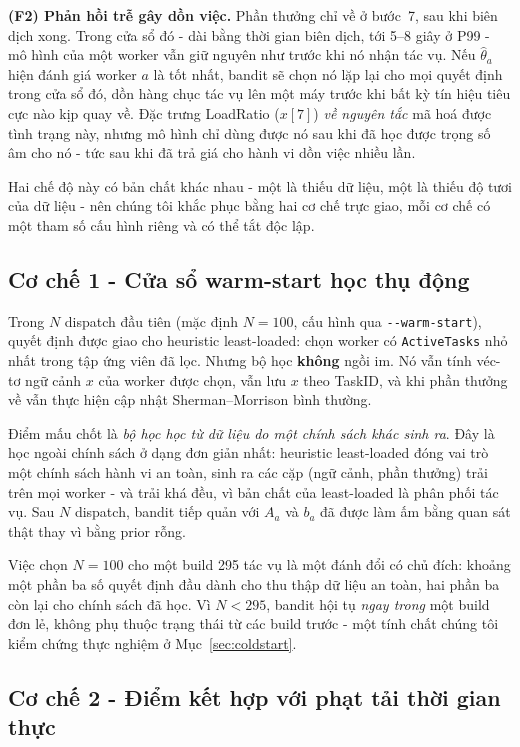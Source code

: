 \documentclass[final,5p,times,twocolumn]{elsarticle}
\begin{document}
\textbf{(F2) Phản hồi trễ gây dồn việc.} Phần thưởng chỉ về ở bước~7, sau khi biên dịch xong. Trong cửa sổ đó - dài bằng thời gian biên dịch, tới 5--8 giây ở P99 - mô hình của một worker vẫn giữ nguyên như trước khi nó nhận tác vụ. Nếu $\hat\theta_a$ hiện đánh giá worker $a$ là tốt nhất, bandit sẽ chọn nó lặp lại cho mọi quyết định trong cửa sổ đó, dồn hàng chục tác vụ lên một máy trước khi bất kỳ tín hiệu tiêu cực nào kịp quay về. Đặc trưng LoadRatio ($x[7]$) \emph{về nguyên tắc} mã hoá được tình trạng này, nhưng mô hình chỉ dùng được nó sau khi đã học được trọng số âm cho nó - tức sau khi đã trả giá cho hành vi dồn việc nhiều lần.

Hai chế độ này có bản chất khác nhau - một là thiếu dữ liệu, một là thiếu độ tươi của dữ liệu - nên chúng tôi khắc phục bằng hai cơ chế trực giao, mỗi cơ chế có một tham số cấu hình riêng và có thể tắt độc lập.

\subsection{Cơ chế 1 - Cửa sổ warm-start học thụ động}
\label{sec:mech1}

Trong $N$ dispatch đầu tiên (mặc định $N=100$, cấu hình qua \texttt{-{}-warm-start}), quyết định được giao cho heuristic least-loaded: chọn worker có \texttt{ActiveTasks} nhỏ nhất trong tập ứng viên đã lọc. Nhưng bộ học \textbf{không} ngồi im. Nó vẫn tính véc-tơ ngữ cảnh $x$ của worker được chọn, vẫn lưu $x$ theo TaskID, và khi phần thưởng về vẫn thực hiện cập nhật Sherman--Morrison bình thường.

Điểm mấu chốt là \emph{bộ học học từ dữ liệu do một chính sách khác sinh ra}. Đây là học ngoài chính sách ở dạng đơn giản nhất: heuristic least-loaded đóng vai trò một chính sách hành vi an toàn, sinh ra các cặp (ngữ cảnh, phần thưởng) trải trên mọi worker - và trải khá đều, vì bản chất của least-loaded là phân phối tác vụ. Sau $N$ dispatch, bandit tiếp quản với $A_a$ và $b_a$ đã được làm ấm bằng quan sát thật thay vì bằng prior rỗng.

Việc chọn $N=100$ cho một build 295 tác vụ là một đánh đổi có chủ đích: khoảng một phần ba số quyết định đầu dành cho thu thập dữ liệu an toàn, hai phần ba còn lại cho chính sách đã học. Vì $N<295$, bandit hội tụ \emph{ngay trong} một build đơn lẻ, không phụ thuộc trạng thái từ các build trước - một tính chất chúng tôi kiểm chứng thực nghiệm ở Mục~\ref{sec:coldstart}.

\subsection{Cơ chế 2 - Điểm kết hợp với phạt tải thời gian thực}
\label{sec:mech2}
\end{document}
